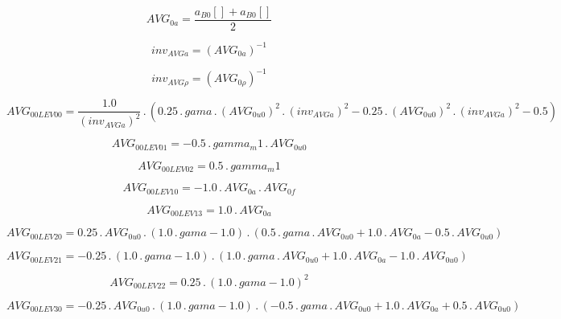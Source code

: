 \documentclass{article}
\begin{document}
\begin{dmath}AVG_{0 a} = \frac{{a{_{B0}}}[{}] + {a{_{B0}}}[{}]}{2}\end{dmath}

\begin{dmath}inv_{AVG a} = \left(AVG_{0 a} \right)^{-1}\end{dmath}

\begin{dmath}inv_{AVG \rho} = \left(AVG_{0 \rho} \right)^{-1}\end{dmath}

\begin{dmath}AVG_{0 0 LEV 00} = \frac{1.0}{\left(inv_{AVG a} \right)^{2}} \,.\, \left(0.25 \,.\, gama \,.\, \left(AVG_{0 u0} \right)^{2} \,.\, \left(inv_{AVG a} \right)^{2} - 0.25 \,.\, \left(AVG_{0 u0} \right)^{2} \,.\, \left(inv_{AVG a} \right)^{2} 
- 0.5\right)\end{dmath}

\begin{dmath}AVG_{0 0 LEV 01} = - 0.5 \,.\, gamma_m1 \,.\, AVG_{0 u0}\end{dmath}

\begin{dmath}AVG_{0 0 LEV 02} = 0.5 \,.\, gamma_m1\end{dmath}

\begin{dmath}AVG_{0 0 LEV 10} = - 1.0 \,.\, AVG_{0 a} \,.\, AVG_{0 f}\end{dmath}

\begin{dmath}AVG_{0 0 LEV 13} = 1.0 \,.\, AVG_{0 a}\end{dmath}

\begin{dmath}AVG_{0 0 LEV 20} = 0.25 \,.\, AVG_{0 u0} \,.\, \left(1.0 \,.\, gama - 1.0\right) \,.\, \left(0.5 \,.\, gama \,.\, AVG_{0 u0} + 1.0 \,.\, AVG_{0 a} - 0.5 \,.\, AVG_{0 u0}\right)\end{dmath}

\begin{dmath}AVG_{0 0 LEV 21} = - 0.25 \,.\, \left(1.0 \,.\, gama - 1.0\right) \,.\, \left(1.0 \,.\, gama \,.\, AVG_{0 u0} + 1.0 \,.\, AVG_{0 a} - 1.0 \,.\, AVG_{0 u0}\right)\end{dmath}

\begin{dmath}AVG_{0 0 LEV 22} = 0.25 \,.\, \left(1.0 \,.\, gama - 1.0 \right)^{2}\end{dmath}

\begin{dmath}AVG_{0 0 LEV 30} = - 0.25 \,.\, AVG_{0 u0} \,.\, \left(1.0 \,.\, gama - 1.0\right) \,.\, \left(- 0.5 \,.\, gama \,.\, AVG_{0 u0} + 1.0 \,.\, AVG_{0 a} + 0.5 \,.\, AVG_{0 u0}\right)\end{dmath}
\end{document}
